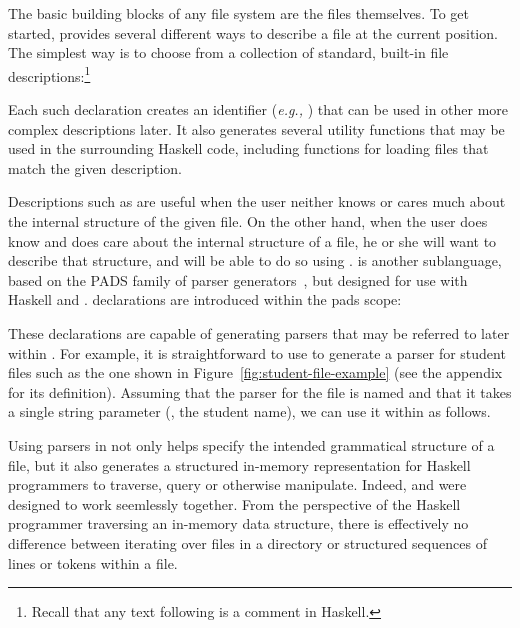 The basic building blocks of any file system are the files themselves.  To get started,
\forest{} provides several different ways to describe a file at the current position.  The simplest
way is to choose from a collection of standard, built-in file descriptions:\footnote{Recall that
any text following \cd{--} is a comment in Haskell.} 
\noindent
\begin{code}
[forest| 
  type MyText = File Ptext   -- a text file
  type MyBin = File Pbin     -- a binary file
  type Whatever = File Pany  -- any file at all
|]
\end{code}
Each such declaration creates an identifier ({\it e.g.,} ) that can be used in other
more complex descriptions later.  It also generates several utility functions that may
be used in the surrounding Haskell code, including functions 
for loading files that match the given description.  

Descriptions such as  are useful when the user neither knows or cares much about
the internal structure of the given file.  On the other hand, when the user does know and does
care about the internal structure of a file, he or she will want to describe that structure,
and will be able to do so using \padshaskell{}.  \padshaskell{} is another sublanguage,
based on the PADS family of parser 
generators~\cite{fisher+:pads,fisher+:popl06,mandelbaum+:pads-ml}, but 
designed for use with Haskell and \forest{}.  \padshaskell{} declarations are introduced
within the pads scope:
\noindent
\begin{code}
\end{code}
These declarations are capable of generating parsers that may be referred
to later within \forest{}.  For example, it is straightforward to use \padshaskell{} to generate
a parser for student files such as the one shown in Figure~\ref{fig:student-file-example}
(see the appendix for its definition).
Assuming that the parser for the file is named  and that it takes a single string parameter
(, the student name), we can use it within \forest{} as follows.
\begin{code}
[forest| 
  type SFile (n::String) = File (Student n) 
|]
\end{code}
Using \padshaskell{} parsers in \forest{} not only helps specify the intended grammatical structure
of a file, but it also generates a structured in-memory representation for Haskell programmers
to traverse, query or otherwise manipulate.  Indeed, \padshaskell{} and \forest{}
were designed to work seemlessly together.  From the perspective of the Haskell
programmer traversing an in-memory data structure, there is effectively
no difference between iterating over files in a directory or
structured sequences of lines or tokens within a file.

